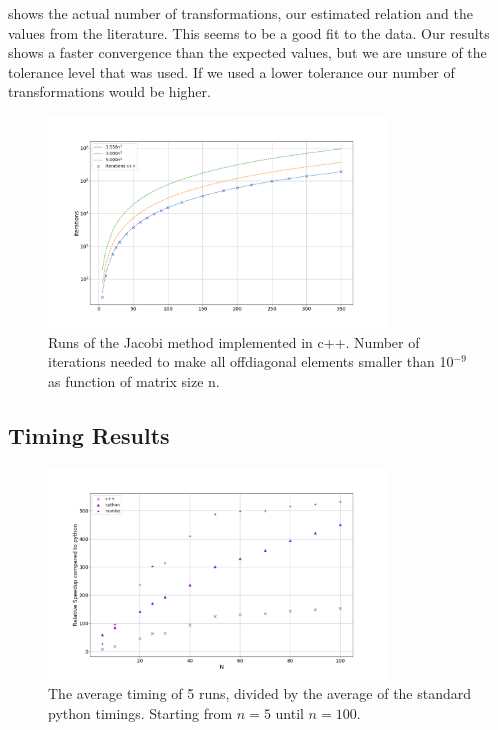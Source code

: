  shows the
actual number of transformations, our estimated relation and the values from the
literature. This seems to be a good fit to the data. Our results shows a faster
convergence than the expected values, but we are unsure of the tolerance level
that was used. If we used a lower tolerance our number of transformations would
be higher.




\begin{figure}[H]
  \centering
  \includegraphics[width=0.8\textwidth]{../figures/iterations.png}

  \caption{Runs of the Jacobi method implemented in c++. Number of iterations
  needed to make all offdiagonal elements smaller than 10$^{-9}$ as function of
  matrix size n.}

  \label{fig:iterations}
\end{figure}


\subsection*{Timing Results}

\begin{figure}[H]
  \centering
  \includegraphics[width=0.8\textwidth]{../figures/avgspeed.png}
  \caption{ The average timing of 5 runs, divided by the average of the standard
  python timings. Starting from $n=5$ until $n=100$. }
  \label{fig:comp_python}
\end{figure}

